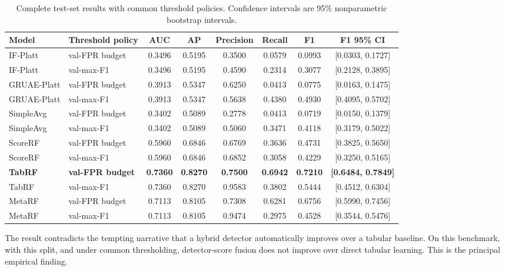 \documentclass[10pt,journal,compsoc]{IEEEtran}
\begin{document}
\begin{table}[t]
\centering
\caption{Complete test-set results with common threshold policies. Confidence intervals are 95\% nonparametric bootstrap intervals.}
\label{tab:full_results}
\begin{tabular}{llcccccc}
\toprule
\textbf{Model} & \textbf{Threshold policy} & \textbf{AUC} & \textbf{AP} & \textbf{Precision} & \textbf{Recall} & \textbf{F1} & \textbf{F1 95\% CI} \\
\midrule
IF-Platt & val-FPR budget & 0.3496 & 0.5195 & 0.3500 & 0.0579 & 0.0993 & [0.0303, 0.1727] \\
IF-Platt & val-max-F1 & 0.3496 & 0.5195 & 0.4590 & 0.2314 & 0.3077 & [0.2128, 0.3895] \\
GRUAE-Platt & val-FPR budget & 0.3913 & 0.5347 & 0.6250 & 0.0413 & 0.0775 & [0.0163, 0.1475] \\
GRUAE-Platt & val-max-F1 & 0.3913 & 0.5347 & 0.5638 & 0.4380 & 0.4930 & [0.4095, 0.5702] \\
SimpleAvg & val-FPR budget & 0.3402 & 0.5089 & 0.2778 & 0.0413 & 0.0719 & [0.0150, 0.1379] \\
SimpleAvg & val-max-F1 & 0.3402 & 0.5089 & 0.5060 & 0.3471 & 0.4118 & [0.3179, 0.5022] \\
ScoreRF & val-FPR budget & 0.5960 & 0.6846 & 0.6769 & 0.3636 & 0.4731 & [0.3825, 0.5650] \\
ScoreRF & val-max-F1 & 0.5960 & 0.6846 & 0.6852 & 0.3058 & 0.4229 & [0.3250, 0.5165] \\
\textbf{TabRF} & \textbf{val-FPR budget} & \textbf{0.7360} & \textbf{0.8270} & \textbf{0.7500} & \textbf{0.6942} & \textbf{0.7210} & \textbf{[0.6484, 0.7849]} \\
TabRF & val-max-F1 & 0.7360 & 0.8270 & 0.9583 & 0.3802 & 0.5444 & [0.4512, 0.6304] \\
MetaRF & val-FPR budget & 0.7113 & 0.8105 & 0.7308 & 0.6281 & 0.6756 & [0.5990, 0.7456] \\
MetaRF & val-max-F1 & 0.7113 & 0.8105 & 0.9474 & 0.2975 & 0.4528 & [0.3544, 0.5476] \\
\bottomrule
\end{tabular}
\end{table}

The result contradicts the tempting narrative that a hybrid detector automatically improves over a tabular baseline. On this benchmark, with this split, and under common thresholding, detector-score fusion does not improve over direct tabular learning. This is the principal empirical finding.
\end{document}
